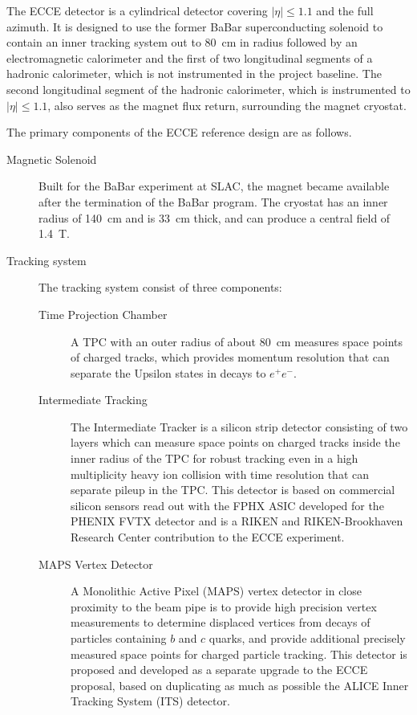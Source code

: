 The ECCE detector is a cylindrical detector covering
$\left|\eta\right| \leq 1.1$ and the full azimuth.  It is designed to use
the former BaBar superconducting solenoid to contain
an inner tracking system out to 80~cm in radius followed by an
electromagnetic calorimeter and the first of two longitudinal segments of
a hadronic calorimeter, which is not instrumented in the project baseline.  The second
longitudinal segment of the hadronic calorimeter, which is instrumented to
$|\eta| \leq 1.1$, also serves as
the magnet flux return, surrounding the magnet cryostat.


The primary components of the ECCE reference design are as follows.

\begin{description}

\item[Magnetic Solenoid]  Built for the BaBar experiment at
  SLAC, the magnet became available after the termination of the BaBar
  program.  The cryostat has an inner radius of 140~cm and is 33~cm
  thick, and can produce a central field of 1.4~T.

\item[Tracking system] The tracking system consist of three components:

\begin{description}

\item[Time Projection Chamber] A TPC with an outer radius of about 80~cm
measures space points of charged tracks, which provides momentum resolution that can
separate the Upsilon states in decays to $e^+e^-$.

\item[Intermediate Tracking] The Intermediate Tracker is a silicon strip
detector consisting of two layers which can measure space points
on charged tracks inside the inner radius of the TPC for robust tracking
even in a high multiplicity heavy ion collision with time resolution that
can separate pileup in the TPC.
This detector is based on commercial silicon
sensors read out with the FPHX ASIC developed for the PHENIX FVTX detector and
is a RIKEN and RIKEN-Brookhaven Research Center contribution to the ECCE
experiment.

\item[MAPS Vertex Detector] A Monolithic Active Pixel (MAPS) vertex
detector in close proximity to the beam pipe is to provide high precision
vertex measurements to determine displaced vertices from decays
of particles containing $b$ and $c$ quarks, and provide additional precisely
measured space points for charged particle tracking.  This detector is
proposed and developed as a separate upgrade to the ECCE proposal,
based on duplicating as much as possible the ALICE Inner Tracking System (ITS)
detector.


\end{description}
\end{description}
